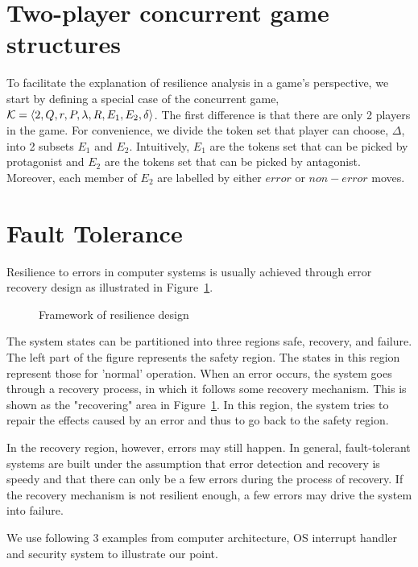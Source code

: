 \section{Two-player concurrent game structures}
To facilitate the explanation of resilience analysis in a game's perspective, we start by defining a special case of the concurrent game, ${\cal K}=\langle 2,Q,r,P,\lambda,R,E_1,E_2,\delta\rangle$.
The first difference is that there are only 2 players in the game.
For convenience, we divide the token set that player can choose, $\Delta$, into 2 subsets $E_1$ and $E_2$.
Intuitively, $E_1$ are the tokens set that can be picked by protagonist and $E_2$ are the tokens set that can be picked by antagonist.
Moreover, each member of $E_2$ are labelled by either $error$ or $non-error$ moves.

\section{Fault Tolerance}
Resilience to errors in computer systems is usually achieved through error recovery design as illustrated in Figure~\ref{fig.frwk}.  
\begin{figure}[t]
\begin{center}
\caption{Framework of resilience design}
\label{fig.frwk} 
\end{center}
\end{figure}
The system states can be partitioned into three regions safe, recovery, and failure. 
The left part of the figure represents the safety region.
The states in this region represent those for 'normal' operation. 
When an error occurs, the system goes through a recovery process, in which it follows some recovery mechanism.
This is shown as the "recovering" area in Figure~\ref{fig.frwk}.
In this region, the system tries to repair the effects caused by an error and thus to go back to the safety region. 

In the recovery region, however, errors may still happen.
In general, fault-tolerant systems are built under the assumption that error detection and recovery is speedy and that there can only be a few errors during the process of recovery.
If the recovery mechanism is not resilient enough, a few errors may drive the system into failure.  

We use following 3 examples from computer architecture, OS interrupt handler and security system to illustrate our point. 

